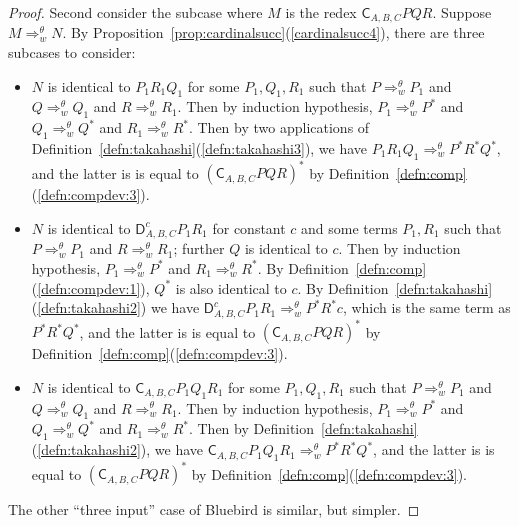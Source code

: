\documentclass{lmcs} %
\newcommand{\param}{\theta}
\newcommand{\Reduces}[2]{\Rightarrow_{#1}^{#2}}
\newcommand{\ctC}[6]{{\mathsf C}_{#1, #2, #3}#4#5#6}
\newcommand{\ctD}[6]{{\mathsf D}^{#1}_{#2, #3, #4}#5#6}
\begin{document}
\begin{proof}
Second consider the subcase where $M$ is the redex $\ctC{A}{B}{C}{P}{Q}{R}$. Suppose $M\Reduces{w}{\param} N$. By Proposition~\ref{prop:cardinalsucc}(\ref{cardinalsucc4}), there are three subcases to consider:
\begin{itemize}[leftmargin=*]
    \item $N$ is identical to $P_1R_1Q_1$ for some $P_1,Q_1, R_1$ such that $P\Reduces{w}{\param} P_1$ and $Q\Reduces{w}{\param} Q_1$ and $R\Reduces{w}{\param} R_1$.  Then by induction hypothesis, $P_1\Reduces{w}{\param} P^{\ast}$ and  $Q_1\Reduces{w}{\param} Q^{\ast}$ and  $R_1\Reduces{w}{\param} R^{\ast}$. Then by two applications of Definition~\ref{defn:takahashi}(\ref{defn:takahashi3}), we have $P_1R_1Q_1 \Reduces{w}{\param} P^{\ast} R^{\ast} Q^{\ast}$, and the latter is is equal to $(\ctC{A}{B}{C}{P}{Q}{R})^{\ast}$ by Definition~\ref{defn:comp}(\ref{defn:compdev:3}).
    \item  $N$ is identical to $\ctD{c}{A}{B}{C}{P_1}{R_1}{}$ for constant $c$ and some terms $P_1,R_1$ such that $P\Reduces{w}{\param} P_1$ and  $R\Reduces{w}{\param} R_1$; further $Q$ is identical to $c$.  Then by induction hypothesis, $P_1\Reduces{w}{\param} P^{\ast}$ and $R_1\Reduces{w}{\param} R^{\ast}$. By Definition~\ref{defn:comp}(\ref{defn:compdev:1}), $Q^{\ast}$ is also identical to $c$.
    By Definition~\ref{defn:takahashi}(\ref{defn:takahashi2}) we have $\ctD{c}{A}{B}{C}{P_1}{R_1}{}\Reduces{w}{\param} P^{\ast}R^{\ast} c$, which is the same term as $P^{\ast}R^{\ast} Q^{\ast}$, and the latter is is equal to $(\ctC{A}{B}{C}{P}{Q}{R})^{\ast}$ by Definition~\ref{defn:comp}(\ref{defn:compdev:3}).   
    \item  $N$ is identical to $\ctC{A}{B}{C}{P_1}{Q_1}{R_1}$ for some $P_1,Q_1, R_1$ such that $P\Reduces{w}{\param} P_1$ and $Q\Reduces{w}{\param} Q_1$ and $R\Reduces{w}{\param} R_1$.  Then by induction hypothesis, $P_1\Reduces{w}{\param} P^{\ast}$ and  $Q_1\Reduces{w}{\param} Q^{\ast}$ and  $R_1\Reduces{w}{\param} R^{\ast}$.  Then by Definition~\ref{defn:takahashi}(\ref{defn:takahashi2}), we have $\ctC{A}{B}{C}{P_1}{Q_1}{R_1}\Reduces{w}{\param} P^{\ast}R^{\ast}Q^{\ast}$, and the latter is is equal to $(\ctC{A}{B}{C}{P}{Q}{R})^{\ast}$ by Definition~\ref{defn:comp}(\ref{defn:compdev:3}).
\end{itemize}

The other ``three input'' case of Bluebird is similar, but simpler.
\end{proof}
\end{document}

